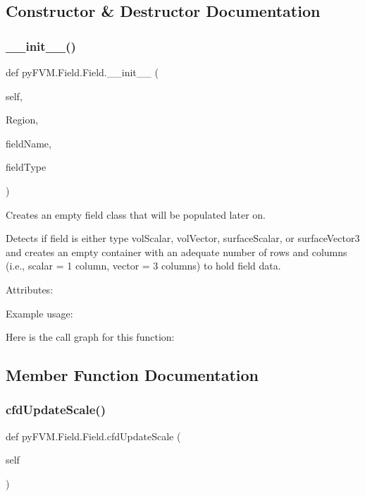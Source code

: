 \subsection{Constructor \& Destructor Documentation}
\mbox{\label{classpy_f_v_m_1_1_field_1_1_field_a16d21209c4df20b4e5350d8dcca9a654}} 
\subsubsection{\texorpdfstring{\_\_init\_\_()}{\_\_init\_\_()}}
{\footnotesize\ttfamily def py\+F\+V\+M.\+Field.\+Field.\+\_\+\+\_\+init\+\_\+\+\_\+ (\begin{DoxyParamCaption}\item[{}]{self,  }\item[{}]{Region,  }\item[{}]{field\+Name,  }\item[{}]{field\+Type }\end{DoxyParamCaption})}

\begin{DoxyVerb}Creates an empty field class that will be populated later on.

Detects if field is either type volScalar, volVector, surfaceScalar, or 
surfaceVector3 and creates an empty container with an adequate number of rows
and columns (i.e., scalar = 1 column, vector = 3 columns) to hold field data.

Attributes:
    
   
Example usage:\end{DoxyVerb}
 Here is the call graph for this function\+:


\subsection{Member Function Documentation}
\mbox{\label{classpy_f_v_m_1_1_field_1_1_field_a28b389b43c708f061166753dd23c395e}} 
\subsubsection{\texorpdfstring{cfdUpdateScale()}{cfdUpdateScale()}}
{\footnotesize\ttfamily def py\+F\+V\+M.\+Field.\+Field.\+cfd\+Update\+Scale (\begin{DoxyParamCaption}\item[{}]{self }\end{DoxyParamCaption})}

